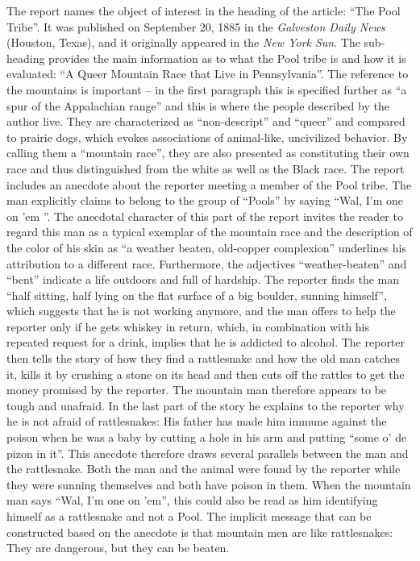 The report names the object of interest in the heading of the article: “The Pool Tribe”. It was published on September 20, 1885 in the \emph{Galveston Daily News} (Houston, Texas), and it originally appeared in the \emph{New York Sun}. The sub-heading provides the main information as to what the Pool tribe is and how it is evaluated: “A Queer Mountain Race that Live in Pennsylvania”. The reference to the mountains is important – in the first paragraph this is specified further as “a spur of the Appalachian range” and this is where the people described by the author live. They are characterized as “non-descript” and “queer” and compared to prairie dogs, which evokes associations of animal-like, uncivilized behavior. By calling them a “mountain race”, they are also presented as constituting their own race and thus distinguished from the white as well as the Black race. The report includes an anecdote about the reporter meeting a member of the Pool tribe. The man explicitly claims to belong to the group of “Pools” by saying “Wal, I’m one on ’em ”. The anecdotal character of this part of the report invites the reader to regard this man as a typical exemplar of the mountain race and the description of the color of his skin as “a weather beaten, old-copper complexion” underlines his attribution to a different race. Furthermore, the adjectives “weather-beaten” and “bent” indicate a life outdoors and full of hardship. The reporter finds the man “half sitting, half lying on the flat surface of a big boulder, sunning himself”, which suggests that he is not working anymore, and the man offers to help the reporter only if he gets whiskey in return, which, in combination with his repeated request for a drink, implies that he is addicted to alcohol. The reporter then tells the story of how they find a rattlesnake and how the old man catches it, kills it by crushing a stone on its head and then cuts off the rattles to get the money promised by the reporter. The mountain man therefore appears to be tough and unafraid. In the last part of the story he explains to the reporter why he is not afraid of rattlesnakes: His father has made him immune against the poison when he was a baby by cutting a hole in his arm and putting “some o’ de pizon in it”. This anecdote therefore draws several parallels between the man and the rattlesnake. Both the man and the animal were found by the reporter while they were sunning themselves and both have poison in them. When the mountain man says “Wal, I’m one on ’em”, this could also be read as him identifying himself as a rattlesnake and not a Pool. The implicit message that can be constructed based on the anecdote is that mountain men are like rattlesnakes: They are dangerous, but they can be beaten.

